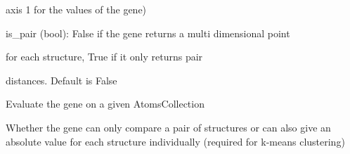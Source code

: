 \documentclass[letterpaper,10pt,english]{sphinxmanual}
\begin{document}
\begin{fulllineitems}
\begin{DUlineblock}{0em}
\begin{DUlineblock}{\DUlineblockindent}
\begin{DUlineblock}{\DUlineblockindent}
\begin{DUlineblock}{\DUlineblockindent}
\item[]
\begin{DUlineblock}{\DUlineblockindent}
\item[] axis 1 for the values of the gene)
\end{DUlineblock}
\end{DUlineblock}
\end{DUlineblock}
\item[] is\_pair (bool): False if the gene returns a multi dimensional point
\item[]
\begin{DUlineblock}{\DUlineblockindent}
\item[] for each structure, True if it only returns pair
\item[] distances. Default is False
\end{DUlineblock}
\end{DUlineblock}
\end{DUlineblock}

\begin{fulllineitems}
\label{doctree/soprano.analyse.phylogen.genes:soprano.analyse.phylogen.genes.Gene.evaluate}
Evaluate the gene on a given AtomsCollection

\end{fulllineitems}


\begin{fulllineitems}
\label{doctree/soprano.analyse.phylogen.genes:soprano.analyse.phylogen.genes.Gene.is_pair}
Whether the gene can only compare a pair of structures or can also
give an absolute value for each structure individually (required for
k-means clustering)

\end{fulllineitems}


\end{fulllineitems}

\end{document}
